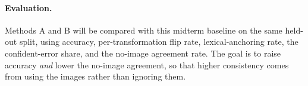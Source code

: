 \paragraph{Evaluation.}
Methods A and B will be compared with this midterm baseline on the same held-out split, using
accuracy, per-transformation flip rate, lexical-anchoring rate, the confident-error share, and
the no-image agreement rate. The goal is to raise accuracy \emph{and} lower the no-image
agreement, so that higher consistency comes from using the images rather than ignoring them.



